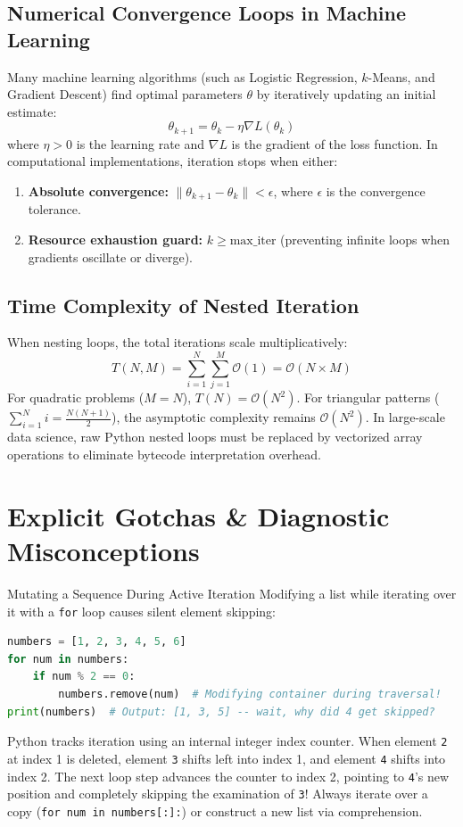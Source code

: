 \subsection{Numerical Convergence Loops in Machine Learning}
Many machine learning algorithms (such as Logistic Regression, $k$-Means, and Gradient Descent) find optimal parameters $\theta$ by iteratively updating an initial estimate:
\begin{equation}
\theta_{k+1} = \theta_k - \eta \nabla L(\theta_k)
\end{equation}
where $\eta > 0$ is the learning rate and $\nabla L$ is the gradient of the loss function. In computational implementations, iteration stops when either:
\begin{enumerate}
    \item \textbf{Absolute convergence:} $\|\theta_{k+1} - \theta_k\| < \epsilon$, where $\epsilon$ is the convergence tolerance.
    \item \textbf{Resource exhaustion guard:} $k \ge \text{max\_iter}$ (preventing infinite loops when gradients oscillate or diverge).
\end{enumerate}

\subsection{Time Complexity of Nested Iteration}
When nesting loops, the total iterations scale multiplicatively:
\begin{equation}
T(N, M) = \sum_{i=1}^N \sum_{j=1}^M \mathcal{O}(1) = \mathcal{O}(N \times M)
\end{equation}
For quadratic problems ($M = N$), $T(N) = \mathcal{O}(N^2)$. For triangular patterns ($\sum_{i=1}^N i = \frac{N(N+1)}{2}$), the asymptotic complexity remains $\mathcal{O}(N^2)$. In large-scale data science, raw Python nested loops must be replaced by vectorized array operations to eliminate bytecode interpretation overhead.

\section{Explicit Gotchas \& Diagnostic Misconceptions}

\begin{trapbox}{Mutating a Sequence During Active Iteration}
Modifying a list while iterating over it with a \texttt{for} loop causes silent element skipping:
\begin{lstlisting}[language=Python]
numbers = [1, 2, 3, 4, 5, 6]
for num in numbers:
    if num % 2 == 0:
        numbers.remove(num)  # Modifying container during traversal!
print(numbers)  # Output: [1, 3, 5] -- wait, why did 4 get skipped?
\end{lstlisting}
Python tracks iteration using an internal integer index counter. When element \texttt{2} at index 1 is deleted, element \texttt{3} shifts left into index 1, and element \texttt{4} shifts into index 2. The next loop step advances the counter to index 2, pointing to \texttt{4}'s new position and completely skipping the examination of \texttt{3}! Always iterate over a copy (\texttt{for num in numbers[:]:}) or construct a new list via comprehension.
\end{trapbox}

